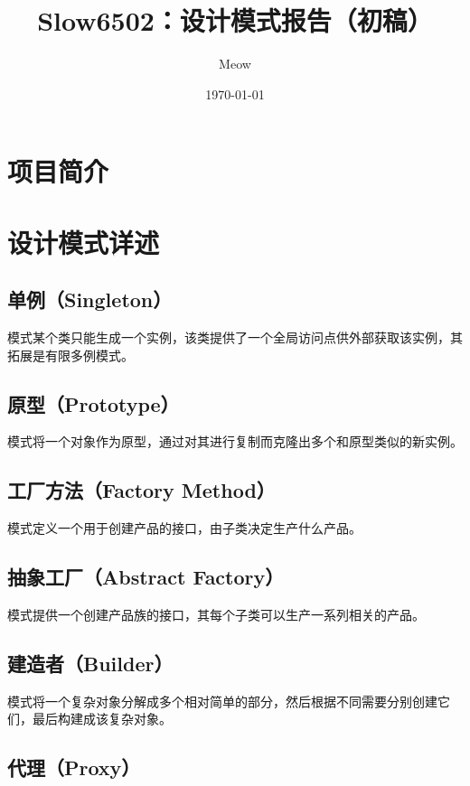 \documentclass[cn,black,12pt,normal]{elegantnote}
\title{Slow6502：设计模式报告（初稿）}
\author{Meow}
\institute{软件学院}
\date{\today}
\begin{document}
\maketitle

\tableofcontents

\newpage

\section{项目简介}

\section{设计模式详述}

\subsection{单例（Singleton）}

模式某个类只能生成一个实例，该类提供了一个全局访问点供外部获取该实例，其拓展是有限多例模式。

\subsection{原型（Prototype）}

模式将一个对象作为原型，通过对其进行复制而克隆出多个和原型类似的新实例。

\subsection{工厂方法（Factory Method）}

模式定义一个用于创建产品的接口，由子类决定生产什么产品。

\subsection{抽象工厂（Abstract Factory）}

模式提供一个创建产品族的接口，其每个子类可以生产一系列相关的产品。

\subsection{建造者（Builder）}

模式将一个复杂对象分解成多个相对简单的部分，然后根据不同需要分别创建它们，最后构建成该复杂对象。

\subsection{代理（Proxy）}
\end{document}
